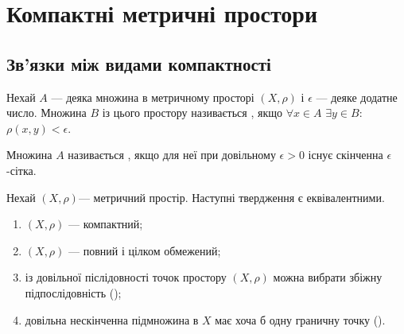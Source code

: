 \chapter{Компактні метричні простори}

\section{Зв'язки між видами компактності}

\begin{definition}
Нехай $A$ --- деяка множина в метричному
просторі $(X, \rho)$ і $\epsilon$ --- деяке додатне число. Множина $B$
із цього простору називається ,
якщо $\forall x \in A$ $\exists y \in B$: $\rho(x, y) < \epsilon$.
\end{definition}

\begin{definition}
Множина $A$ називається ,
якщо для неї при довільному $\epsilon > 0$ існує скінченна $\epsilon$-сітка.
\end{definition}

\begin{theorem}
[Хаусдорф] Нехай $(X, \rho)$--- метричний
простір. Наступні твердження є еквівалентними.
\begin{enumerate}
\item $(X, \rho)$ --- компактний;
\item $(X, \rho)$ --- повний і цілком обмежений;
\item із довільної післідовності точок простору $(X, \rho)$
можна вибрати збіжну підпослідовність
();
\item довільна нескінченна підмножина в $X$ має хоча б одну
граничну точку ().
\end{enumerate}
\end{theorem}

